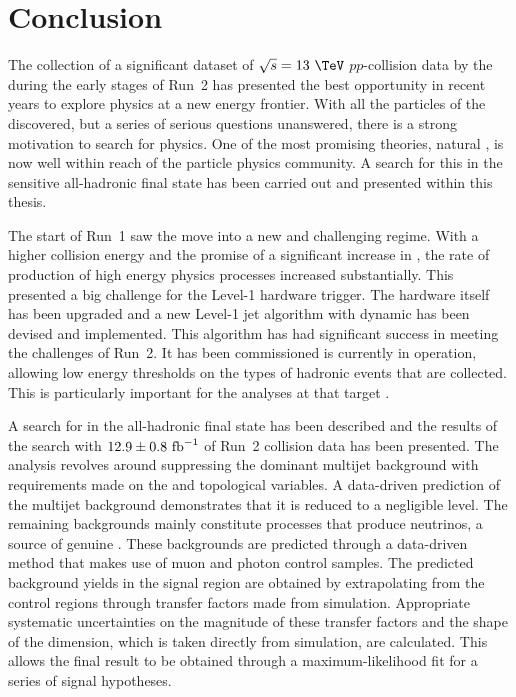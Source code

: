 \chapter{Conclusion}
\label{chap:conclusion}

The collection of a significant dataset of $\sqrt{s}=13~\tev$
$pp$-collision data by the \LHC during the early stages of Run~2 has
presented the best opportunity in recent years to explore \BSM physics
at a new energy frontier. With all the particles of the \SM
discovered, but a series of serious questions unanswered, there is a
strong motivation to search for \BSM physics. One of the most
promising \BSM theories, natural \SUSY, is now well within reach of
the particle physics community. A search for this in the
sensitive all-hadronic final state has been carried out and presented
within this thesis.

The start of Run~1 saw the \LHC move into a new and challenging
regime. With a higher collision energy and the promise of a
significant increase in \PU, the rate of production of high energy
physics processes increased substantially. This presented a
big challenge for the Level-1 hardware trigger. The hardware itself has been upgraded and a new Level-1 jet
algorithm with dynamic \PUS has been devised and implemented. This
algorithm has had significant success in meeting the challenges of
Run~2. It has been commissioned is currently
in operation, allowing low energy thresholds on the types of hadronic
events that are collected. This is particularly important for the analyses at \CMS that
target \SUSY.

A search for \SUSY in the all-hadronic final state has been described
and the results of the search with $12.9\pm0.8~\text{fb}^{-1}$ of Run~2
collision data has been presented. The analysis revolves around
suppressing the dominant \QCD multijet background with requirements
made on the \alphat and \bdphi topological variables. A data-driven
prediction of the multijet background demonstrates that it
is reduced to a negligible level. The remaining backgrounds 
mainly constitute \SM processes that produce neutrinos, a
source of genuine \MET. These backgrounds are predicted through a
data-driven method that makes use of muon and photon control samples.
The predicted background yields in the signal region are obtained by
extrapolating from the control regions through transfer factors made
from
simulation. Appropriate systematic uncertainties on the magnitude of
these transfer factors and the shape of the \MHT dimension, which is
taken directly from simulation, are calculated. This allows the final result to
be obtained through a maximum-likelihood fit for a series of signal
hypotheses.

